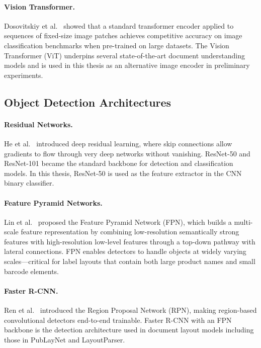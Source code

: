 \paragraph{Vision Transformer.}
Dosovitskiy et al.~\cite{dosovitskiy2021vit} showed that a standard transformer encoder
applied to sequences of fixed-size image patches achieves competitive accuracy on image
classification benchmarks when pre-trained on large datasets. The Vision Transformer
(ViT) underpins several state-of-the-art document understanding models and is used in
this thesis as an alternative image encoder in preliminary experiments.

\subsection{Object Detection Architectures}
\label{ssec:objdet}

\paragraph{Residual Networks.}
He et al.~\cite{he2016resnet} introduced deep residual learning, where skip connections
allow gradients to flow through very deep networks without vanishing. ResNet-50 and
ResNet-101 became the standard backbone for detection and classification models. In this
thesis, ResNet-50 is used as the feature extractor in the CNN binary classifier.

\paragraph{Feature Pyramid Networks.}
Lin et al.~\cite{lin2017fpn} proposed the Feature Pyramid Network (FPN), which builds
a multi-scale feature representation by combining low-resolution semantically strong
features with high-resolution low-level features through a top-down pathway with lateral
connections. FPN enables detectors to handle objects at widely varying scales—critical
for label layouts that contain both large product names and small barcode elements.

\paragraph{Faster R-CNN.}
Ren et al.~\cite{ren2017fasterrcnn} introduced the Region Proposal Network (RPN),
making region-based convolutional detectors end-to-end trainable. Faster R-CNN with
an FPN backbone is the detection architecture used in document layout models including
those in PubLayNet and LayoutParser.

